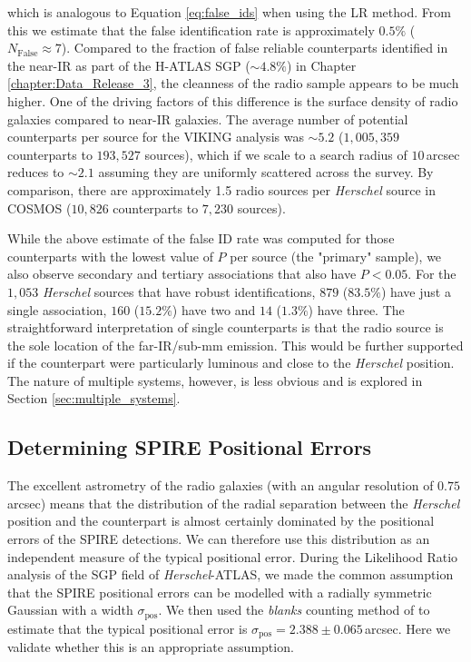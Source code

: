\noindent which is analogous to Equation \ref{eq:false_ids} when using the LR method. From this we estimate that the false identification rate is approximately $0.5\%$ ($N_\textrm{False} \approx 7$). Compared to the fraction of false reliable counterparts identified in the near-IR as part of the H-ATLAS SGP ($\sim 4.8\%$) in Chapter \ref{chapter:Data_Release_3}, the cleanness of the radio sample appears to be much higher. One of the driving factors of this difference is the surface density of radio galaxies compared to near-IR galaxies. The average number of potential counterparts per source for the VIKING analysis was $\sim 5.2$ ($1,005,359$ counterparts to $193,527$ sources), which if we scale to a search radius of $10\,$arcsec reduces to $\sim 2.1$ assuming they are uniformly scattered across the survey. By comparison, there are approximately 1.5 radio sources per \textit{Herschel} source in COSMOS ($10,826$ counterparts to $7,230$ sources).

While the above estimate of the false ID rate was computed for those counterparts with the lowest value of $P$ per source (the "primary" sample), we also observe secondary and tertiary associations that also have $P < 0.05$. For the $1,053$ \textit{Herschel} sources that have robust identifications, $879$ ($83.5\%$) have just a single association, $160$ ($15.2\%$) have two and $14$ ($1.3\%$) have three. The straightforward interpretation of single counterparts is that the radio source is the sole location of the far-IR/sub-mm emission. This would be further supported if the counterpart were particularly luminous and close to the \textit{Herschel} position. The nature of multiple systems, however, is less obvious and is explored in Section \ref{sec:multiple_systems}.

\subsection{Determining SPIRE Positional Errors}

The excellent astrometry of the radio galaxies (with an angular resolution of $0.75\,$arcsec) means that the distribution of the radial separation between the \textit{Herschel} position and the counterpart is almost certainly dominated by the positional errors of the SPIRE detections. We can therefore use this distribution as an independent measure of the typical positional error. During the Likelihood Ratio analysis of the SGP field of \textit{Herschel}-ATLAS, we made the common assumption that the SPIRE positional errors can be modelled with a radially symmetric Gaussian with a width $\sigma_\textrm{pos}$. We then used the \textit{blanks} counting method of \citealt{Fleuren_2012} to estimate that the typical positional error is $\sigma_\textrm{pos} = 2.388\pm0.065\,$arcsec. Here we validate whether this is an appropriate assumption.

